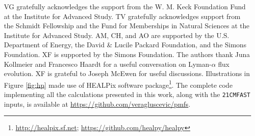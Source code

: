 \acknowledgements

VG gratefully acknowledges the support from the W. M. Keck Foundation Fund at the Institute for Advanced Study. TV gratefully acknowledges support from the Schmidt Fellowship and the Fund for Memberships in Natural Sciences at the Institute for Advanced Study. AM, CH, and AO are supported by the U.S. Department of Energy, the David \& Lucile Packard Foundation, and the Simons Foundation. XF is supported by the Simons Foundation. The authors thank Juna Kollmeier and Francesco Haardt for a useful conversation on Lyman-$\alpha$ flux evolution. XF is grateful to Joseph McEwen for useful discussions. Illustrations in Figure \ref{fig:hp} made use of HEALPix \cite{2005ApJ...622..759G} software package\footnote{\url{ http://healpix.sf.net}; \url{https://github.com/healpy/healpy}}. The complete code implementing all the calculations presented in this work, along with the \texttt{21CMFAST} inputs, is available at \url{https://github.com/veragluscevic/pmfs}.